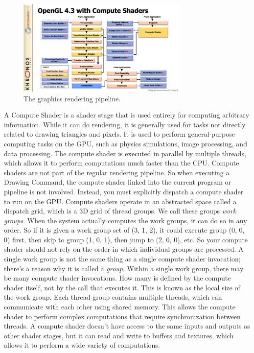 \documentclass{report}
\begin{document}
\begin{figure}[h!]
	\centering
	\includegraphics[width=0.75\textwidth]{img/compute_shaders.jpg}
	\caption{The graphics rendering pipeline.}
	\label{fig:pipeline}
\end{figure}

A Compute Shader is a shader stage that is used entirely for computing arbitrary information. While
it can do rendering, it is generally used for tasks not directly related to drawing triangles and
pixels. It is used to perform general-purpose computing tasks on the GPU, such as physics
simulations, image processing, and data processing. The compute shader is executed in parallel by
multiple threads, which allows it to perform computations much faster than the CPU. Compute shaders
are not part of the regular rendering pipeline. So when executing a Drawing Command, the compute
shader linked into the current program or pipeline is not involved. Instead, you must explicitly
dispatch a compute shader to run on the GPU. Compute shaders operate in an abstracted space called
a dispatch grid, which is a 3D grid of thread groups. We call these groups \textit{work groups}.
When the system actually computes the work groups, it can do so in any order. So if it is given a
work group set of (3, 1, 2), it could execute group (0, 0, 0) first, then skip to group (1, 0, 1),
then jump to (2, 0, 0), etc. So your compute shader should not rely on the order in which
individual groups are processed. A single work group is not the same thing as a single compute
shader invocation; there's a reason why it is called a \textit{group}. Within a single work group,
there may be many compute shader invocations. How many is defined by the compute shader itself, not
by the call that executes it. This is known as the local size of the work group. Each thread group
contains multiple threads, which can communicate with each other using shared memory. This allows
the compute shader to perform complex computations that require synchronization between threads. A
compute shader doesn't have access to the same inputs and outputs as other shader stages, but it
can read and write to buffers and textures, which allows it to perform a wide variety of
computations.
\end{document}
